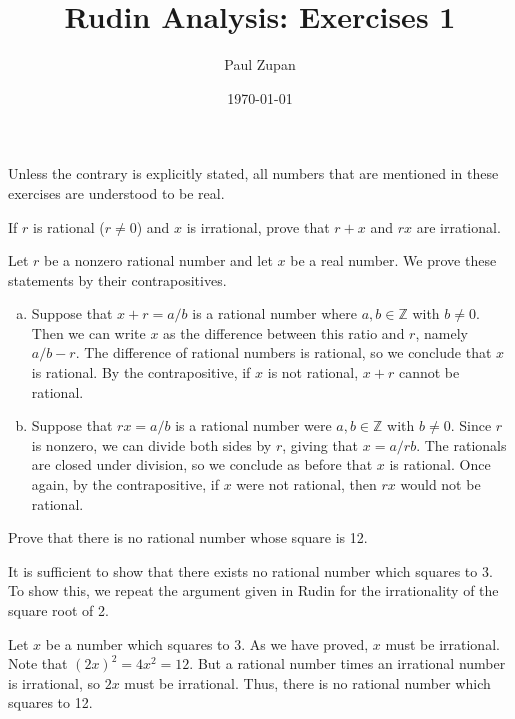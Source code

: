 \documentclass{zupan}
\title{Rudin Analysis: Exercises 1}
\author{Paul Zupan}
\date{\today}
\begin{document}
\maketitle

Unless the contrary is explicitly stated, all numbers that are mentioned in
these exercises are understood to be real.

\begin{exercise}{1}
  If $r$ is rational ($r \neq 0$) and $x$ is irrational, prove that $r + x$ and
  $rx$ are irrational.
\end{exercise}

\begin{solution}
  Let $r$ be a nonzero rational number and let $x$ be a real number. We prove
  these statements by their contrapositives.

  \begin{enumerate}[(a)]
    \item Suppose that $x + r = a/b$ is a rational number where $a, b \in
      \mathbb{Z}$ with $b \neq 0$. Then we can write $x$ as the difference
      between this ratio and $r$, namely $a/b - r$. The difference of rational
      numbers is rational, so we conclude that $x$ is rational. By the
      contrapositive, if $x$ is not rational, $x + r$ cannot be rational.
    \item Suppose that $rx = a/b$ is a rational number were $a, b \in
      \mathbb{Z}$ with $b \neq 0$. Since $r$ is nonzero, we can divide both
      sides by $r$, giving that $x = a/rb$. The rationals are closed under
      division, so we conclude as before that $x$ is rational. Once again, by
      the contrapositive, if $x$ were not rational, then $rx$ would not be
      rational.
  \end{enumerate}
\end{solution}

\begin{exercise}{2}
  Prove that there is no rational number whose square is 12.
\end{exercise}

\begin{solution}
  It is sufficient to show that there exists no rational number which squares
  to 3. To show this, we repeat the argument given in Rudin for the
  irrationality of the square root of 2.

  Let $x$ be a number which squares to 3. As we have proved, $x$ must be
  irrational. Note that $(2x)^2 = 4x^2 = 12$. But a rational number times an
  irrational number is irrational, so $2x$ must be irrational. Thus, there is
  no rational number which squares to 12.
\end{solution}
\end{document}
